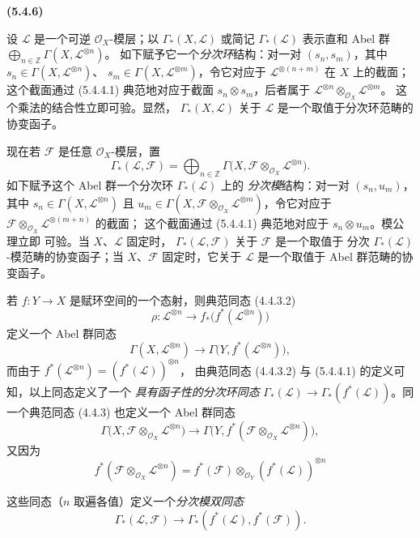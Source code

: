 \documentclass[UTF8,fontset=none,11pt,oneside,openany]{ctexbook}
\newenvironment{env}[1][]{%
  \par\medskip\noindent\textbf{(#1)}\ %
}{\par}
\newcommand{\oldpage}[2][]{%
  \hypertarget{ega-source-page-#1-#2}{}%
  \marginnote{\scriptsize\textbf{#1}~|~#2}\ignorespaces}
\let\EGAOriginalLabel\label
\renewcommand{\label}[1]{\phantomsection\EGAOriginalLabel{#1}}
\begin{document}
\begin{env}[5.4.6]
\label{0.5.4.6-fr}
设 $\mathcal{L}$ 是一个可逆 $\mathcal{O}_X$-模层；以
$\Gamma_*(X,\mathcal{L})$ 或简记 $\Gamma_*(\mathcal{L})$ 表示直和
Abel 群 $\bigoplus_{n\in\mathbb{Z}}\Gamma(X,\mathcal{L}^{\otimes n})$。
如下赋予它一个\emph{分次环}结构：对一对 $(s_n,s_m)$，其中
$s_n\in\Gamma(X,\mathcal{L}^{\otimes n})$、
$s_m\in\Gamma(X,\mathcal{L}^{\otimes m})$，令它对应于
$\mathcal{L}^{\otimes(n+m)}$ 在 $X$ 上的截面；这个截面通过 (5.4.4.1)
典范地对应于截面 $s_n\otimes s_m$，后者属于
$\mathcal{L}^{\otimes n}\otimes_{\mathcal{O}_X}\mathcal{L}^{\otimes m}$。
这个乘法的结合性立即可验。显然，
$\Gamma_*(X,\mathcal{L})$ 关于 $\mathcal{L}$ 是一个取值于分次环范畴的
协变函子。

现在若 $\mathcal{F}$ 是任意 $\mathcal{O}_X$-模层，置
\[
  \Gamma_*(\mathcal{L},\mathcal{F})
  =\bigoplus_{n\in\mathbb{Z}}
   \Gamma\bigl(X,
     \mathcal{F}\otimes_{\mathcal{O}_X}\mathcal{L}^{\otimes n}\bigr).
\]
如下赋予这个 Abel 群一个分次环 $\Gamma_*(\mathcal{L})$ 上的
\emph{分次模}结构：对一对 $(s_n,u_m)$，其中
$s_n\in\Gamma(X,\mathcal{L}^{\otimes n})$ 且
$u_m\in\Gamma(X,
\mathcal{F}\otimes_{\mathcal{O}_X}\mathcal{L}^{\otimes m})$，令它对应于
$\mathcal{F}\otimes_{\mathcal{O}_X}\mathcal{L}^{\otimes(m+n)}$ 的截面；
这个截面通过 (5.4.4.1) 典范地对应于 $s_n\otimes u_m$。模公理立即
可验。当 $X$、$\mathcal{L}$ 固定时，
$\Gamma_*(\mathcal{L},\mathcal{F})$ 关于 $\mathcal{F}$ 是一个取值于
分次 $\Gamma_*(\mathcal{L})$-模范畴的协变函子；当 $X$、$\mathcal{F}$
固定时，它关于 $\mathcal{L}$ 是一个取值于 Abel 群范畴的协变函子。

若 $f:Y\to X$ 是赋环空间的一个态射，则典范同态 (4.4.3.2)
\[
  \rho:\mathcal{L}^{\otimes n}
  \longrightarrow
  f_*\bigl(f^*(\mathcal{L}^{\otimes n})\bigr)
\]
定义一个 Abel 群同态
\[
  \Gamma(X,\mathcal{L}^{\otimes n})
  \longrightarrow
  \Gamma\bigl(Y,f^*(\mathcal{L}^{\otimes n})\bigr),
\]
而由于 $f^*(\mathcal{L}^{\otimes n})=(f^*(\mathcal{L}))^{\otimes n}$，
由典范同态 (4.4.3.2) 与 (5.4.4.1) 的定义可知，以上同态定义了一个
\emph{具有函子性的分次环同态}
$\Gamma_*(\mathcal{L})\to\Gamma_*(f^*(\mathcal{L}))$。同一个典范同态
(4.4.3) 也定义一个 Abel 群同态
\[
  \Gamma\bigl(X,
    \mathcal{F}\otimes_{\mathcal{O}_X}\mathcal{L}^{\otimes n}\bigr)
  \longrightarrow
  \Gamma\bigl(Y,
    f^*(\mathcal{F}\otimes_{\mathcal{O}_X}\mathcal{L}^{\otimes n})\bigr),
\]
又因为
\[
  f^*(\mathcal{F}\otimes_{\mathcal{O}_X}\mathcal{L}^{\otimes n})
  =f^*(\mathcal{F})\otimes_{\mathcal{O}_Y}
   (f^*(\mathcal{L}))^{\otimes n}
  \tag{4.3.3.1}
\]

\oldpage[0\textsubscript{I}]{51}

这些同态（$n$ 取遍各值）定义一个\emph{分次模双同态}
\[
  \Gamma_*(\mathcal{L},\mathcal{F})
  \longrightarrow
  \Gamma_*(f^*(\mathcal{L}),f^*(\mathcal{F})).
\]
\end{env}
\end{document}
